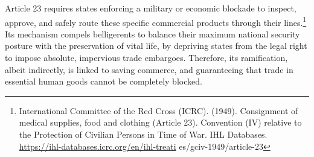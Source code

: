 Article 23 requires states enforcing a military or economic blockade to inspect, approve, and safely route these specific commercial products through their lines.\footnote{International Committee of the Red Cross (ICRC). (1949). Consignment of medical supplies, food and clothing (Article 23). Convention (IV) relative to the Protection of Civilian Persons in Time of War. IHL Databases. \url{https://ihl-databases.icrc.org/en/ihl-treati} es/gciv-1949/article-23} Its mechanism compels belligerents to balance their maximum national security posture with the preservation of vital life, by depriving states from the legal right to impose absolute, impervious trade embargoes. Therefore, its ramification, albeit indirectly, is linked to saving commerce, and guaranteeing that trade in essential human goods cannot be completely blocked.

